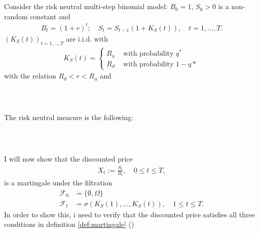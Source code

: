 \documentclass{beamer}
\numberwithin{equation}{section}
\begin{document}
\begin{frame}\frametitle{{\normalsize \secname} \\ {\large \subsecname}}
    Consider the risk neutral multi-step binomial model: $B_0 = 1$, $S_0 > 0$ is a non-random constant and
    \begin{align}
        B_t = (1 + r)^t; \quad S_t = S_{t-1}(1 + K_S(t)), \quad t = 1, \ldots, T.
    \end{align}
    $(K_S(t))_{t = 1, \ldots, T}$ are i.i.d. with
    \begin{align}
        K_S(t) =
        \begin{cases}
            R_u &\text{ with probability } q^* \\
            R_d &\text{ with probability } 1-q*
        \end{cases}
    \end{align}
    with the relation $R_d < r < R_u$ and
\end{frame}

\begin{frame}\frametitle{{\normalsize \secname} \\ {\large \subsecname}}
    The risk neutral measure is the following:
    \vspace{6cm}
\end{frame}

\begin{frame}\frametitle{{\normalsize \secname} \\ {\large \subsecname}}
    I will now show that the discounted price
    \begin{align}
        X_t := \frac{S_t}{B_t}, \quad 0 \leq t \leq T,
    \end{align}
    is a martingale under the filtration
    \begin{align}
        \mathscr{F}_0 &= \{ \emptyset, \Omega\} \label{eq:information_at_time_0} \\
        \mathscr{F}_t &= \sigma(K_S(1), \ldots, K_S(t)), \quad 1 \leq t \leq T. \label{eq:information_at_time_1}
    \end{align}
    In order to show this, i need to verify that the discounted price satisfies all three conditions in definition \ref{def:martingale} ()
\end{frame}
\end{document}
